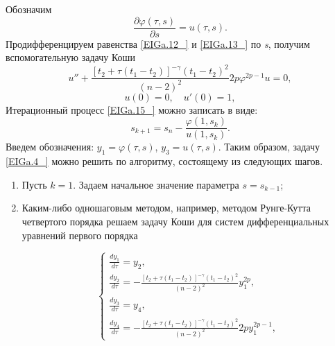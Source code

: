 Обозначим
\begin{equation*}\frac{\partial \varphi \left(\tau ,s\right)}{\partial s} =u\left(\tau ,s\right).\end{equation*}
Продифференцируем равенства \eqref{EIGa.12_} и \eqref{EIGa.13_} по \textit{s}, получим вспомогательную задачу Коши
\begin{equation}u''+\frac{\left[t_{2} +\tau \left(t_{1} -t_{2} \right)\right]^{-\gamma } \left(t_{1} -t_{2} \right)^{2} }{\left(n-2\right)^{2} } 2p\varphi ^{2p-1} u=0, \label{EIGa.16_}\end{equation}
\begin{equation}u\left(0\right)=0,\quad u'\left(0\right)=1,         \label{EIGa.17_}\end{equation}
Итерационный процесс \eqref{EIGa.15_} можно записать в виде:
\begin{equation*}s_{k+1} =s_{n} -\frac{\varphi \left(1,s_{k} \right)}{u\left(1,s_{k} \right)}.\end{equation*}
Введем обозначения: $y_{1} =\varphi \left(\tau ,s\right)$, $y_{3} =u\left(\tau ,s\right)$.
Таким образом, задачу \eqref{EIGa.4_} можно решить по алгоритму, состоящему из следующих шагов.
\begin{enumerate}[1) ]
  \item  Пусть $k=1$. Задаем начальное значение параметра $s=s_{k-1} $;

  \item  Каким-либо одношаговым методом, например, методом Рунге-Кутта четвертого порядка решаем задачу Коши для систем дифференциальных уравнений первого порядка

\[\left\{\begin{array}{c} {\frac{dy_{1} }{d\tau } =y_{2} ,\begin{array}{ccc} {\begin{array}{ccc} {\begin{array}{ccc} {} & {} & {} \end{array}} & {} & {} \end{array}} & {} & {} \end{array}} \\ {\frac{dy_{2} }{d\tau } =-\frac{\left[t_{2} +\tau \left(t_{1} -t_{2} \right)\right]^{-\gamma } \left(t_{1} -t_{2} \right)^{2} }{\left(n-2\right)^{2} } y_{1}^{2p} ,\begin{array}{cc} {} & {} \end{array}} \\ {\frac{dy_{3} }{d\tau } =y_{4} ,\begin{array}{cc} {\begin{array}{ccc} {\begin{array}{cc} {\begin{array}{ccc} {} & {} & {} \end{array}} & {} \end{array}} & {} & {} \end{array}} & {} \end{array}} \\ {\frac{dy_{4} }{d\tau } =-\frac{\left[t_{2} +\tau \left(t_{1} -t_{2} \right)\right]^{-\gamma } \left(t_{1} -t_{2} \right)^{2} }{\left(n-2\right)^{2} } 2py_{1}^{2p-1} ,} \end{array}\right. \]
\end{enumerate}
